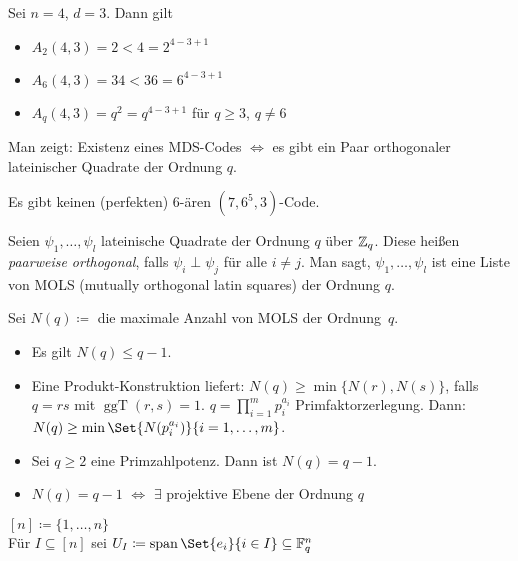 \documentclass{cheat-sheet}
\newcommand{\F}{\mathbb{F}} %
\DeclareMathOperator{\spann}{span} %
\DeclareMathOperator{\ggT}{ggT} %
\begin{document}
\begin{satz}
  Sei $n=4$, $d=3$.
  Dann gilt
  \begin{itemize}
    \item $A_2(4, 3) = 2 < 4 = 2^{4-3+1}$
    \item $A_6(4,3) = 34 < 36 = 6^{4-3+1}$
    \item $A_q(4,3) = q^2 = q^{4-3+1}$ für $q \geq 3$, $q \neq 6$
  \end{itemize}
\end{satz}

\begin{beweisidee}
  Man zeigt: Existenz eines MDS-Codes $\iff$ es gibt ein Paar orthogonaler lateinischer Quadrate der Ordnung $q$.
\end{beweisidee}

\begin{satz}
  Es gibt keinen (perfekten) $6$-ären $(7, 6^5, 3)$-Code.
\end{satz}

\begin{defn}
  Seien $\psi_1, \ldots, \psi_l$ lateinische Quadrate der Ordnung $q$ über $\mathbb{Z}_q$.
  Diese heißen \emph{paarweise orthogonal}, falls $\psi_i \perp \psi_j$ für alle $i \neq j$.
  Man sagt, $\psi_1, \ldots, \psi_l$ ist eine Liste von MOLS (mutually orthogonal latin squares) der Ordnung $q$.
\end{defn}

\begin{bem}
  Sei $N(q) \coloneqq $ die maximale Anzahl von MOLS der Ordnung~$q$.
  \begin{itemize}
    \item Es gilt $N(q) \leq q - 1$.
    \item Eine Produkt-Konstruktion liefert: $N(q) \geq \min \{ N(r), N(s) \}$, falls $q = rs$ mit $\ggT(r, s) = 1$.
    $q = \prod_{i=1}^m p_i^{a_i}$ Primfaktorzerlegung.
    Dann: $N(q) \geq \min \Set{N(p_i^{a_i})}{i = 1, \ldots, m}$.
    \item Sei $q \geq 2$ eine Primzahlpotenz. Dann ist $N(q) = q-1$.
    \item $N(q) = q - 1$ $\iff$ $\exists$ projektive Ebene der Ordnung $q$
  \end{itemize}
\end{bem}



\begin{nota}
  $[n] \coloneqq \{ 1, \ldots, n \}$ \\
  Für $I \subseteq [n]$ sei $U_I \coloneqq \spann \Set{e_i}{i \in I} \subseteq \F_q^n$
\end{nota}
\end{document}
